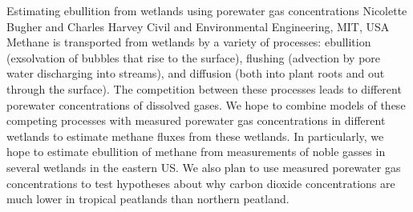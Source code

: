 \begin{conf-abstract}
{Estimating ebullition from wetlands using porewater gas concentrations}
{Nicolette Bugher and Charles Harvey}
{Civil and Environmental Engineering, MIT, USA}
{Methane is transported from wetlands by a variety of processes: ebullition (exsolvation of bubbles that rise to the surface), flushing (advection by pore water discharging into streams), and diffusion (both into plant roots and out through the surface).  The competition between these processes leads to different porewater concentrations of dissolved gases. We hope to combine models of these competing processes with measured porewater gas concentrations in different wetlands to estimate methane fluxes from these wetlands.  In particularly, we hope to estimate ebullition of methane from measurements of noble gasses in several wetlands in the eastern US.  We also plan to use measured porewater gas concentrations to test hypotheses about why carbon dioxide concentrations are much lower in tropical peatlands than northern peatland.}
\end{conf-abstract}
